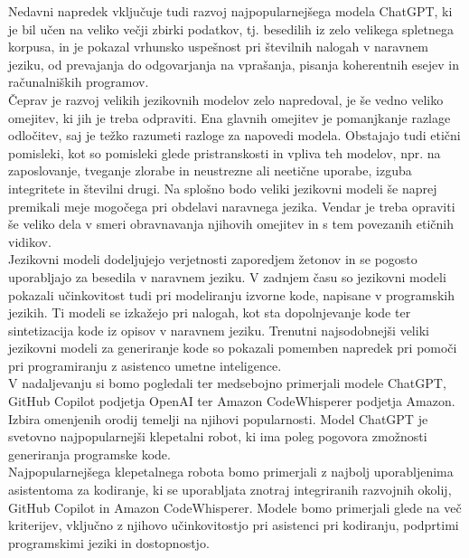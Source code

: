\documentclass[a4paper,12pt,openright]{book}
\begin{document}
Nedavni napredek vključuje tudi razvoj najpopularnejšega modela ChatGPT, ki je bil učen na veliko večji zbirki podatkov, tj. besedilih iz zelo velikega spletnega korpusa, in je pokazal vrhunsko uspešnost pri številnih nalogah v naravnem jeziku, od prevajanja do odgovarjanja na vprašanja, pisanja koherentnih esejev in računalniških programov. \cite{KASNECI2023102274} \\
Čeprav je razvoj velikih jezikovnih modelov zelo napredoval, je še vedno veliko omejitev, ki jih je treba odpraviti. Ena glavnih omejitev je pomanjkanje razlage odločitev, saj je težko razumeti razloge za napovedi modela. Obstajajo tudi etični pomisleki, kot so pomisleki glede pristranskosti in vpliva teh modelov, npr. na zaposlovanje, tveganje zlorabe in neustrezne ali neetične uporabe, izguba integritete in številni drugi. Na splošno bodo veliki jezikovni modeli še naprej premikali meje mogočega pri obdelavi naravnega jezika. Vendar je treba opraviti še veliko dela v smeri obravnavanja njihovih omejitev in s tem povezanih etičnih vidikov.\cite{KASNECI2023102274} \\
Jezikovni modeli dodeljujejo verjetnosti zaporedjem žetonov in se pogosto uporabljajo za besedila v naravnem jeziku. V zadnjem času so jezikovni modeli pokazali učinkovitost tudi pri modeliranju izvorne kode, napisane v programskih jezikih. Ti modeli se izkažejo pri nalogah, kot sta dopolnjevanje kode ter sintetizacija kode iz opisov v naravnem jeziku.
Trenutni najsodobnejši veliki jezikovni modeli za generiranje kode so pokazali pomemben napredek pri pomoči pri programiranju z asistenco umetne inteligence.  \cite{vaswani2023attention} \\
V nadaljevanju si bomo pogledali ter medsebojno primerjali modele ChatGPT, GitHub Copilot podjetja OpenAI ter Amazon CodeWhisperer podjetja Amazon. Izbira omenjenih orodij temelji na njihovi popularnosti. Model ChatGPT je svetovno najpopularnejši klepetalni robot, ki ima poleg pogovora zmožnosti generiranja programske kode\cite{wu2023brief}. \\
Najpopularnejšega klepetalnega robota bomo primerjali z najbolj uporabljenima asistentoma za kodiranje, ki se uporabljata znotraj integriranih razvojnih okolij, GitHub Copilot in Amazon CodeWhisperer. Modele bomo primerjali glede na več kriterijev, vključno z njihovo učinkovitostjo pri asistenci pri kodiranju, podprtimi programskimi jeziki in dostopnostjo.
\end{document}
